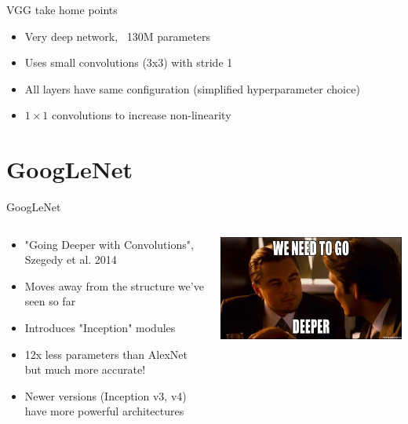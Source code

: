 \documentclass[9pt, aspectratio=169]{beamer}
\begin{document}
\begin{frame}
    {VGG take home points}
    \begin{itemize}
        \item Very deep network, ~130M parameters
        \item Uses small convolutions (3x3) with stride 1
        \item All layers have same configuration (simplified hyperparameter choice)
        \item $1\times 1$ convolutions to increase non-linearity
    \end{itemize}
\end{frame}
\section{GoogLeNet}
\begin{frame}
    {GoogLeNet}
    \begin{columns}
        \begin{column}{.5\textwidth}
            \begin{itemize}
                \item "Going Deeper with Convolutions", Szegedy et al. 2014
                \item Moves away from the structure we've seen so far
                \item Introduces "Inception" modules
                \item 12x less parameters than AlexNet but much more accurate!
                \item Newer versions (Inception v3, v4) have more powerful architectures
            \end{itemize}
        \end{column}
        \begin{column}{.5\textwidth}
            \centering
            \includegraphics[width=\textwidth]{WeNeedToGoDeeper.jpg}
        \end{column}
    \end{columns}
\end{frame}
\end{document}
